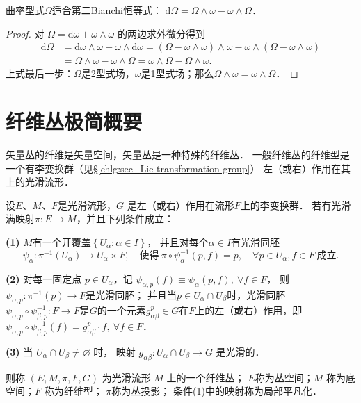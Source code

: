 \begin{theorem}\label{chfb:thm_2ndBianchi}
    曲率型式$\Omega$适合第二Bianchi恒等式：
    $ \mathrm{d} \Omega = \Omega \wedge \omega - \omega \wedge \Omega $．
\end{theorem}
\begin{proof}
对 $\Omega=\mathrm{d} \omega + \omega \wedge \omega$ 的两边求外微分得到
\begin{align*}
    \mathrm{d} \Omega & =\mathrm{d} \omega \wedge \omega- \omega \wedge \mathrm{d} \omega 
     =(\Omega-\omega \wedge \omega) \wedge \omega-\omega \wedge(\Omega-\omega \wedge \omega) \\
    & =\Omega \wedge \omega-\omega \wedge \Omega =\omega \wedge \Omega-\Omega \wedge \omega  .
\end{align*}
上式最后一步：$\Omega$是2型式场，$\omega$是1型式场；那么$\Omega \wedge \omega=\omega \wedge \Omega$．
\end{proof}





\section{纤维丛极简概要}\label{chfb:sec_fb}
矢量丛的纤维是矢量空间，矢量丛是一种特殊的纤维丛．
一般纤维丛的纤维型是一个有李变换群（见\S\ref{chlg:sec_Lie-transformation-group}）
左（或右）作用在其上的光滑流形．

\begin{definition}\label{chfb:def_fibre-bundles}
    设$E$、$ M$、$ F$是光滑流形，$G$ 是左（或右）作用在流形$F$上的李变换群．
    若有光滑满映射$\pi: E \rightarrow M$，并且下列条件成立：
    
    {\bfseries (1)} $M$有一个开覆盖$\left\{U_\alpha: \alpha \in I\right\}$，
    并且对每个$\alpha \in I$有光滑同胚
    \begin{equation*}
        \psi_\alpha: \pi^{-1}(U_\alpha) \to U_\alpha \times F,
        \quad \text{使得}\ 
        \pi \circ \psi_\alpha^{-1}(p, f)=p, \quad \forall p \in U_\alpha, f \in F 
        \ \text{成立}.
    \end{equation*}
    
    {\bfseries (2)} 对每一固定点 $p \in U_\alpha$，记
    $\psi_{\alpha, p}(f)\equiv \psi_\alpha(p, f), \ \forall f \in F$，
    则 $\psi_{\alpha, p}: \pi^{-1}(p)\to F$是光滑同胚；
    并且当$p \in U_\alpha \cap U_\beta$时，光滑同胚$\psi_{\alpha, p}\circ \psi_{\beta, p}^{-1}:
    F \rightarrow F$是$G$的一个元素$g_{\alpha \beta}^p\in G$在$F$上的左（或右）作用，即
    $\psi_{\alpha, p} \circ \psi_{\beta, p}^{-1}(f)=g^p_{\alpha \beta} \cdot f, 
    \ \forall f \in F$．
    
    
    {\bfseries (3)} 当 $U_\alpha \cap U_\beta \neq \varnothing$ 时，
    映射 $g_{\alpha \beta}: U_\alpha \cap U_\beta \rightarrow G$ 是光滑的．
    
    则称 $(E, M, \pi, F, G)$ 为光滑流形 $M$ 上的一个{\heiti 纤维丛}；
    $E$称为{\heiti 丛空间}；$M$ 称为{\heiti 底空间}；$F$ 称为{\heiti 纤维型}；
    $\pi$称为{\heiti 丛投影}；
    条件(1)中的映射称为{\heiti 局部平凡化}．
\end{definition}

